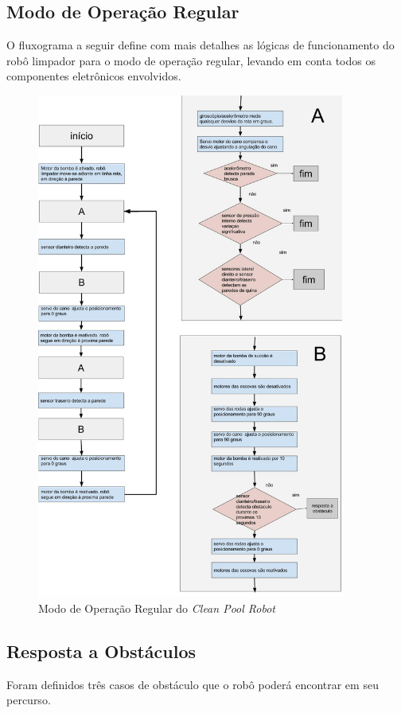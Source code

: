\subsection{Modo de Operação Regular}
O fluxograma a seguir define com mais detalhes as lógicas de funcionamento
do robô limpador para o modo de operação regular, levando em conta todos os
componentes eletrônicos envolvidos.
\par
\begin{figure}[h]
  \centering
  \includegraphics[width=0.9\textwidth]{figures/flow-regular-robot.jpg}
  \caption{Modo de Operação Regular do \textit{Clean Pool Robot}}
  \label{fig:flow-regular-robot}
\end{figure}
\FloatBarrier

\subsection{Resposta a Obstáculos}
Foram definidos três casos de obstáculo que o robô poderá encontrar em seu percurso.

